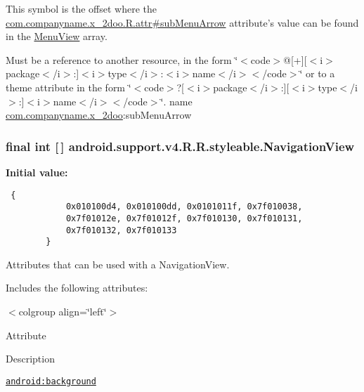 This symbol is the offset where the \hyperlink{classcom_1_1companyname_1_1x__2doo_1_1_r_1_1attr_531c064d5698e0ea147b9b5e4c783d0c}{com.companyname.x\_\-2doo.R.attr\#subMenuArrow} attribute's value can be found in the \hyperlink{classandroid_1_1support_1_1v4_1_1_r_1_1styleable_f27b70b4d764f1a1f59531c58e843a3b}{MenuView} array.

Must be a reference to another resource, in the form \char`\"{}$<$code$>$@\mbox{[}+\mbox{]}\mbox{[}$<$i$>$package$<$/i$>$:\mbox{]}$<$i$>$type$<$/i$>$:$<$i$>$name$<$/i$>$$<$/code$>$\char`\"{} or to a theme attribute in the form \char`\"{}$<$code$>$?\mbox{[}$<$i$>$package$<$/i$>$:\mbox{]}\mbox{[}$<$i$>$type$<$/i$>$:\mbox{]}$<$i$>$name$<$/i$>$$<$/code$>$\char`\"{}.  name \hyperlink{namespacecom_1_1companyname_1_1x__2doo}{com.companyname.x\_\-2doo}:subMenuArrow \hypertarget{classandroid_1_1support_1_1v4_1_1_r_1_1styleable_5278cd545a73a5a4af313995900ae2d8}{
\subsubsection[{NavigationView}]{\setlength{\rightskip}{0pt plus 5cm}final int \mbox{[}$\,$\mbox{]} android.support.v4.R.R.styleable.NavigationView}}
\label{classandroid_1_1support_1_1v4_1_1_r_1_1styleable_5278cd545a73a5a4af313995900ae2d8}


\textbf{Initial value:}

\begin{Code}\begin{verbatim} {
            0x010100d4, 0x010100dd, 0x0101011f, 0x7f010038,
            0x7f01012e, 0x7f01012f, 0x7f010130, 0x7f010131,
            0x7f010132, 0x7f010133
        }
\end{verbatim}
\end{Code}
Attributes that can be used with a NavigationView. 

Includes the following attributes: \begin{TabularC}{0}
\hline
\end{TabularC}
$<$colgroup align=\char`\"{}left\char`\"{}$>$ 

Attribute

Description 

{\tt \hyperlink{classandroid_1_1support_1_1v4_1_1_r_1_1styleable_91a16f1c9df7acfb830e2783aa9b8a8d}{android:background}}

